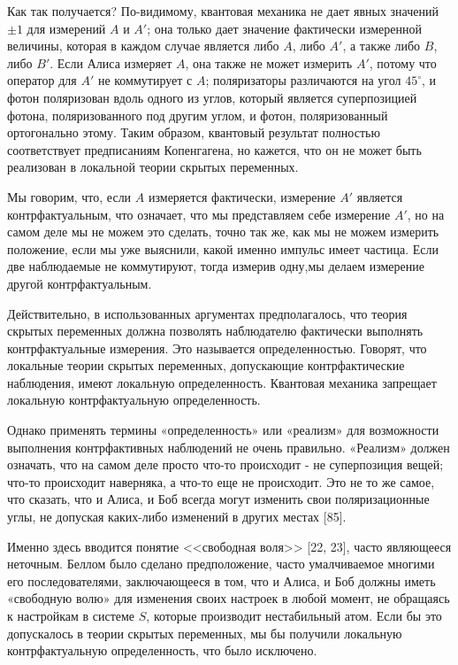 \documentclass[main.tex]{subfiles}
\begin{document}
Как так получается? По-видимому, квантовая механика не дает явных значений $\pm 1$ для измерений $A$ и $A '$; она только дает значение фактически измеренной величины, которая в каждом случае является либо $A$, либо $A '$, а также либо $B$, либо $B'$. Если Алиса измеряет $A$, она также не может измерить $A '$, потому что оператор для $ A'$ не коммутирует с $A$; поляризаторы различаются на угол $45 ^\circ$, и фотон поляризован вдоль одного из углов, который является суперпозицией фотона, поляризованного под другим углом, и фотон, поляризованный ортогонально этому. Таким образом, квантовый результат полностью соответствует предписаниям Копенгагена, но кажется, что он не может быть реализован в локальной теории скрытых переменных.

Мы говорим, что, если $A$ измеряется фактически, измерение $A '$ является контрфактуальным, что означает, что мы представляем себе измерение $A'$, но на самом деле мы не можем это сделать, точно так же, как мы не можем измерить положение, если мы уже выяснили, какой именно импульс имеет частица. Если две наблюдаемые не коммутируют, тогда измерив одну,мы делаем измерение другой контрфактуальным.

Действительно, в использованных аргументах предполагалось, что теория скрытых переменных должна позволять наблюдателю фактически выполнять контрфактуальные измерения. Это называется определенностью. Говорят, что локальные теории скрытых переменных, допускающие контрфактические наблюдения, имеют локальную определенность. Квантовая механика запрещает локальную контрфактуальную определенность.

Однако применять термины «определенность» или «реализм» для возможности выполнения контрфактивных наблюдений не очень правильно. «Реализм» должен означать, что на самом деле просто что-то происходит - не суперпозиция вещей; что-то происходит наверняка, а что-то еще не происходит. Это не то же самое, что сказать, что и Алиса, и Боб всегда могут изменить свои поляризационные углы, не допуская каких-либо изменений в других местах [85].

Именно здесь вводится понятие <<свободная воля>> [22, 23], часто являющееся неточным. Беллом было сделано предположение, часто умалчиваемое многими его последователями, заключающееся в том, что и Алиса, и Боб должны иметь «свободную волю» для изменения своих настроек в любой момент, не обращаясь к настройкам в системе $S$, которые производит нестабильный атом. Если бы это допускалось в теории скрытых переменных, мы бы получили локальную контрфактуальную определенность, что было исключено.
\end{document}
